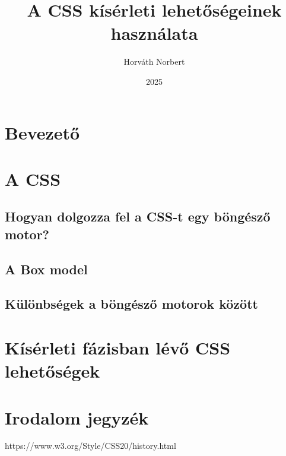 \documentclass{book}
\title{A CSS kísérleti lehetőségeinek használata}
\author{Horváth Norbert}
\date{2025}
\begin{document}
\maketitle
\newpage
{}

\tableofcontents
\newpage

\section{Bevezető}

\section{A CSS}

\subsection{Hogyan dolgozza fel a CSS-t egy böngésző motor?}

\subsection{A Box model}

\subsection{Különbségek a böngésző motorok között}

\section{Kísérleti fázisban lévő CSS lehetőségek}

\section{Irodalom jegyzék}

https://www.w3.org/Style/CSS20/history.html
\end{document}
